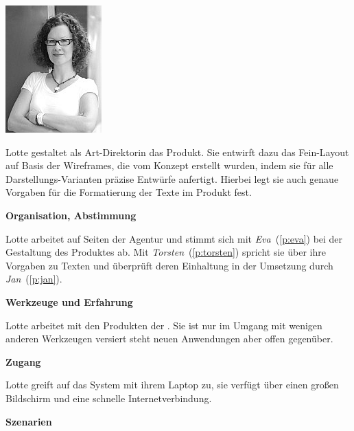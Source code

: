 \begin{multicols}{2}

\begin{center}
\includegraphics[width=0.5\columnwidth]{media/lotte.jpg}
\end{center}


Lotte gestaltet als Art-Direktorin das Produkt. Sie entwirft dazu das Fein-Layout auf Basis der Wireframes, die vom Konzept erstellt wurden, indem sie für alle Darstellungs-Varianten präzise Entwürfe anfertigt. Hierbei legt sie auch genaue Vorgaben für die Formatierung der Texte im Produkt fest.

\textbf{Organisation, Abstimmung}

Lotte arbeitet auf Seiten der Agentur und stimmt sich mit \emph{Eva}~(\ref{p:eva}) bei der Gestaltung des Produktes ab. Mit \emph{Torsten}~(\ref{p:torsten}) spricht sie über ihre Vorgaben zu Texten und überprüft deren Einhaltung in der Umsetzung durch \emph{Jan}~(\ref{p:jan}).

\textbf{Werkzeuge und Erfahrung}

Lotte arbeitet mit den Produkten der . Sie ist nur im Umgang mit wenigen anderen Werkzeugen versiert steht neuen Anwendungen aber offen gegenüber.

\textbf{Zugang}

Lotte greift auf das System mit ihrem Laptop zu, sie verfügt über einen großen Bildschirm und eine schnelle Internetverbindung.

\columnbreak

\textbf{Szenarien}


\end{multicols}
